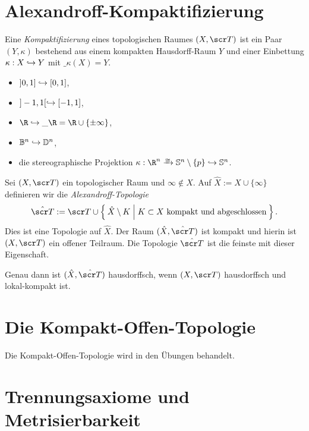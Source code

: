 \section{Alexandroff-Kompaktifizierung}


\begin{df}
	Eine \emph{Kompaktifizierung} eines topologischen Raumes $(X, \scr T)$ ist ein Paar $(Y, \kappa)$ bestehend aus einem kompakten Hausdorff-Raum $Y$ und einer Einbettung $\kappa: X \hookrightarrow Y$ mit $\_{\kappa(X)} = Y$.
\end{df}

\begin{ex}
	\begin{itemize}
		\item
			$]0,1] \hookrightarrow [0,1]$,
		\item
			$]-1,1[ \hookrightarrow [-1,1]$,
		\item
			$\R \injto \_\R = \R \cup \{\pm\infty\}$,
		\item
			$\mathbb{B}^n \hookrightarrow \mathbb{D}^n$,
		\item
			die stereographische Projektion $\kappa: \R^n \homto \S^n \setminus \{p\} \injto \S^n$.
	\end{itemize}
\end{ex}

\begin{st}[Alexandroff]
	Sei $(X, \scr T)$ ein topologischer Raum und $\infty \not\in X$.
	Auf $\hat X := X \cup \{\infty\}$ definieren wir die \emph{Alexandroff-Topologie}
	\[
		\hat{\scr T} :=
		\scr T \cup \Set{ \hat X \setminus K | K \subset X \text{ kompakt und abgeschlossen} }.
	\]
	Dies ist eine Topologie auf $\hat X$.
	Der Raum $(\hat X, \hat{\scr T})$ ist kompakt und hierin ist $(X, \scr T)$ ein offener Teilraum.
	Die Topologie $\hat{\scr T}$ ist die feinste mit dieser Eigenschaft.

	Genau dann ist $(\hat X, \hat{\scr T})$ hausdorffsch, wenn $(X, \scr T)$ hausdorffsch und lokal-kompakt ist.
\end{st}


\section{Die Kompakt-Offen-Topologie}

Die Kompakt-Offen-Topologie wird in den Übungen  behandelt.

\section{Trennungsaxiome und Metrisierbarkeit}


